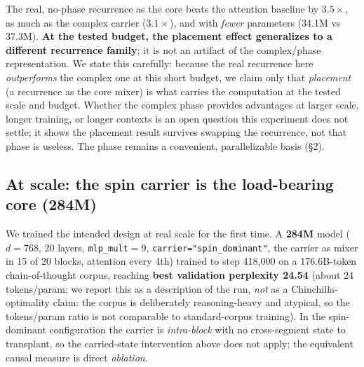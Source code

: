 \documentclass[11pt]{article}
\newcommand{\code}[1]{\texttt{#1}}
\begin{document}
The real, no-phase recurrence as the core beats the attention baseline by \textbf{$3.5\times$}, as much as the complex carrier ($3.1\times$), and with \emph{fewer} parameters (34.1M vs 37.3M). \textbf{At the tested budget, the placement effect generalizes to a different recurrence family}; it is not an artifact of the complex/phase representation. We state this carefully: because the real recurrence here \emph{outperforms} the complex one at this short budget, we claim only that \emph{placement} (a recurrence as the core mixer) is what carries the computation at the tested scale and budget. Whether the complex phase provides advantages at larger scale, longer training, or longer contexts is an open question this experiment does not settle; it shows the placement result survives swapping the recurrence, not that phase is useless. The phase remains a convenient, parallelizable basis (\S2).

\subsection{At scale: the spin carrier is the load-bearing core (284M)}
We trained the intended design at real scale for the first time. A \textbf{284M} model ($d=768$, 20 layers, \code{mlp\_mult}$=9$, \code{carrier="spin\_dominant"}, the carrier as mixer in 15 of 20 blocks, attention every 4th) trained to step 418{,}000 on a 176.6B-token chain-of-thought corpus, reaching \textbf{best validation perplexity 24.54} (about 24 tokens/param; we report this as a description of the run, \emph{not} as a Chinchilla-optimality claim: the corpus is deliberately reasoning-heavy and atypical, so the tokens/param ratio is not comparable to standard-corpus training). In the spin-dominant configuration the carrier is \emph{intra-block} with no cross-segment state to transplant, so the carried-state intervention above does not apply; the equivalent causal measure is direct \emph{ablation}.

\smallskip\noindent{}\smallskip
\end{document}
